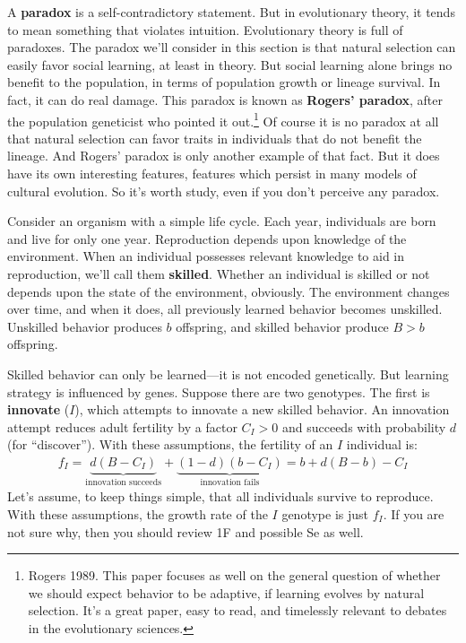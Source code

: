 \documentclass[10pt,reqno]{amsbook}
\newcommand{\bemph}[1]{{\textbf{\textcolor{bemphcol}{#1}}}}
\numberwithin{equation}{chapter}
\begin{document}
A \bemph{paradox} is a self-contradictory statement. But in evolutionary theory, it tends to mean something that violates intuition. Evolutionary theory is full of paradoxes. The paradox we'll consider in this section is that natural selection can easily favor social learning, at least in theory. But social learning alone brings no benefit to the population, in terms of population growth or lineage survival. In fact, it can do real damage. This paradox is known as \bemph{Rogers' paradox}, after the population geneticist who pointed it out.\footnote{Rogers 1989. This paper focuses as well on the general question of whether we should expect behavior to be adaptive, if learning evolves by natural selection. It's a great paper, easy to read, and timelessly relevant to debates in the evolutionary sciences.} Of course it is no paradox at all that natural selection can favor traits in individuals that do not benefit the lineage. And Rogers' paradox is only another example of that fact. But it does have its own interesting features, features which persist in many models of cultural evolution. So it's worth study, even if you don't perceive any paradox.

Consider an organism with a simple life cycle.  Each year, individuals are born and live for only one year. Reproduction depends upon knowledge of the environment. When an individual possesses relevant knowledge to aid in reproduction, we'll call them \bemph{skilled}. Whether an individual is skilled or not depends upon the state of the environment, obviously. The environment changes over time, and when it does, all previously learned behavior becomes unskilled. Unskilled behavior produces $b$ offspring, and skilled behavior produce $B > b$ offspring.

Skilled behavior can only be learned---it is not encoded genetically. But learning strategy is influenced by genes. Suppose there are two genotypes. The first is \bemph{innovate} ($I$), which attempts to innovate a new skilled behavior. An innovation attempt reduces adult fertility by a factor $C_I > 0$ and succeeds with probability $d$ (for ``discover''). With these assumptions, the fertility of an $I$ individual is:
\begin{align*}
	f_I = \underbrace{d(B-C_I)}_{\text{innovation succeeds}} + \underbrace{(1-d)(b-C_I)}_{\text{innovation fails}} = b + d( B - b ) - C_I
\end{align*}
Let's assume, to keep things simple, that all individuals survive to reproduce. With these assumptions, the growth rate of the $I$ genotype is just $f_I$. If you are not sure why, then you should review 1F and possible Se as well.
\end{document}
